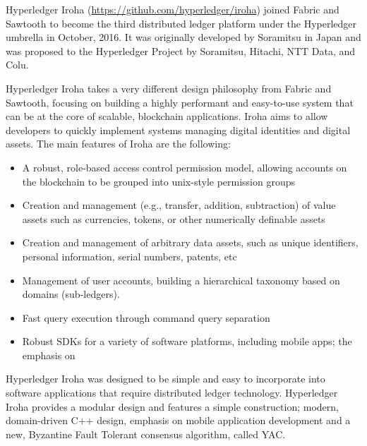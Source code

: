 Hyperledger Iroha (\url{https://github.com/hyperledger/iroha}) joined Fabric and Sawtooth to become the third distributed ledger platform under the Hyperledger umbrella in October, 2016. It was originally developed by Soramitsu in Japan and was proposed to the Hyperledger Project by Soramitsu, Hitachi, NTT Data, and Colu.

Hyperledger Iroha takes a very different design philosophy from Fabric and Sawtooth, focusing on building a highly performant and easy-to-use system that can be at the core of scalable, blockchain applications. Iroha aims to allow developers to quickly implement systems managing digital identities and digital assets. The main features of Iroha are the following:

\begin{itemize}
\item A robust, role-based access control permission model, allowing accounts on the blockchain to be grouped into unix-style permission groups
\item Creation and management (e.g., transfer, addition, subtraction) of value assets such as currencies, tokens, or other numerically definable assets
\item Creation and management of arbitrary data assets, such as unique identifiers, personal information, serial numbers, patents, etc
\item Management of user accounts, building a hierarchical taxonomy based on domains (sub-ledgers).
\item Fast query execution through command query separation
\item Robust SDKs for a variety of software platforms, including mobile apps; the emphasis on 
\end{itemize} 

Hyperledger Iroha was designed to be simple and easy to incorporate into software applications that require distributed ledger technology. Hyperledger Iroha provides a modular design and features a simple construction; modern, domain-driven C++ design, emphasis on mobile application development and a new, Byzantine Fault Tolerant consensus algorithm, called YAC.
